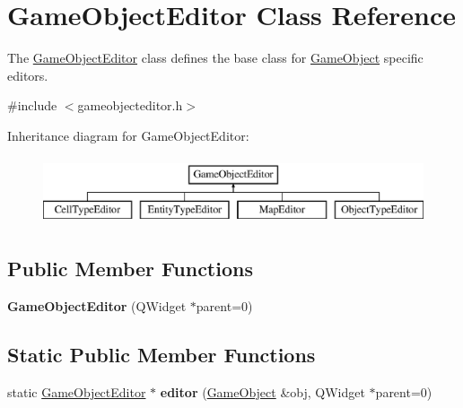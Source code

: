 \hypertarget{class_game_object_editor}{\section{\-Game\-Object\-Editor \-Class \-Reference}
\label{class_game_object_editor}
}


\-The \hyperlink{class_game_object_editor}{\-Game\-Object\-Editor} class defines the base class for \hyperlink{class_game_object}{\-Game\-Object} specific editors.  




{\ttfamily \#include $<$gameobjecteditor.\-h$>$}

\-Inheritance diagram for \-Game\-Object\-Editor\-:\begin{figure}[H]
\begin{center}
\leavevmode
\includegraphics[height=2.000000cm]{class_game_object_editor}
\end{center}
\end{figure}
\subsection*{\-Public \-Member \-Functions}
\begin{DoxyCompactItemize}
\item 
\hypertarget{class_game_object_editor_a3ca8c1b7d22f2f3f8c6b518dae3e21a1}{{\bfseries \-Game\-Object\-Editor} (\-Q\-Widget $\ast$parent=0)}\label{class_game_object_editor_a3ca8c1b7d22f2f3f8c6b518dae3e21a1}

\end{DoxyCompactItemize}
\subsection*{\-Static \-Public \-Member \-Functions}
\begin{DoxyCompactItemize}
\item 
\hypertarget{class_game_object_editor_ad43ed39df888f6b06f9078ab8eff3380}{static \hyperlink{class_game_object_editor}{\-Game\-Object\-Editor} $\ast$ {\bfseries editor} (\hyperlink{class_game_object}{\-Game\-Object} \&obj, \-Q\-Widget $\ast$parent=0)}\label{class_game_object_editor_ad43ed39df888f6b06f9078ab8eff3380}

\end{DoxyCompactItemize}


